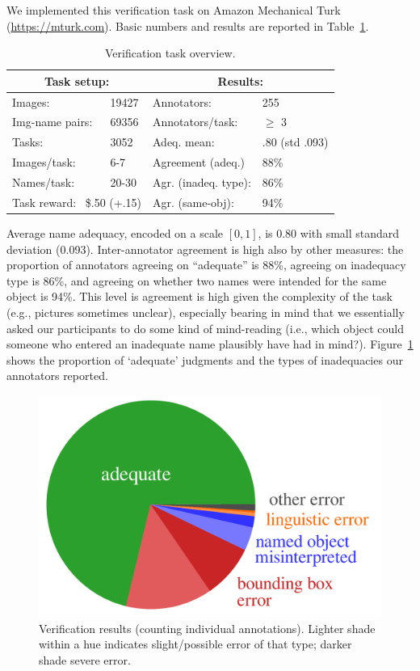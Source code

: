 We implemented this verification task on Amazon Mechanical Turk (\url{https://mturk.com}). 
Basic numbers and results are reported in Table~\ref{tab:verification-numbers}.
\begin{table}[t]
	\centering
	\small
	\begin{tabular}{|ll|ll|}
		\hline
		\multicolumn{2}{|c|}{\textbf{Task setup:}} & \multicolumn{2}{c|}{\textbf{Results:}} \\ \hline
		Images: & 19427 &
			Annotators: & 255 \\
		Img-name pairs: & 69356 &
			Annotators/task: & $\geq$ 3 \\
		Tasks: & 3052 &
			Adeq. mean: & \hspace{-3em}.80 (std .093)\\
		Images/task: & 6-7 &			
			Agreement (adeq.) & 88\% \\ 
		Names/task: & 20-30 &
			Agr. (inadeq. type): & 86\% \\
		\multicolumn{2}{|l|}{Task reward: \ \$.50 (+.15)} & 
			Agr. (same-obj): & 94\% \\
		\hline
	\end{tabular}
	\caption{Verification task overview.}
	\label{tab:verification-numbers}
\end{table}
Average name adequacy, encoded on a scale $[0,1]$, is 0.80 with small standard deviation (0.093). 
Inter-annotator agreement is high also by other measures: the proportion of annotators agreeing on ``adequate'' is 88\%, agreeing on inadequacy type is 86\%, and agreeing on whether two names were intended for the same object is 94\%.
This level is agreement is high given the complexity of the task (e.g., pictures sometimes unclear), especially bearing in mind that we essentially asked our participants to do some kind of mind-reading (i.e., which object could someone who entered an inadequate name plausibly have had in mind?).
Figure~\ref{fig:verification-piechart} shows the proportion of `adequate' judgments and the types of inadequacies our annotators reported.
\begin{figure}[t]
	\centering
	\hspace*{.2\columnwidth}\includegraphics[width=.7\columnwidth]{images/verification_piechart.pdf}
	\caption{Verification results (counting individual annotations). Lighter shade within a hue indicates slight/possible error of that type; darker shade severe error.}
	\label{fig:verification-piechart}
\end{figure}

